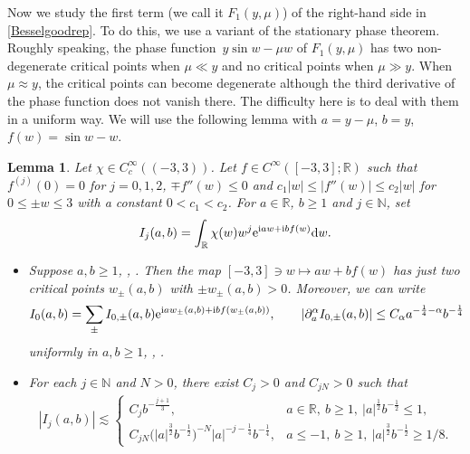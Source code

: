\documentclass[10pt,a4paper]{amsart}
\numberwithin{equation}{section}
\newtheorem{Lemma}[Theorem]{Lemma}
\def\R{\mathbb{R}}%
\def\a{\alpha}
\def\m{\mu}
\def\pa{\partial}
\begin{document}
Now we study the first term (we call it $F_1(y,\m)$) of the right-hand side in \eqref{Besselgoodrep}. To do this, we use a variant of the stationary phase theorem. Roughly speaking, the phase function~${y\sin w-\m w}$ of $F_1(y,\m)$ has two non-degenerate critical points when $\m\ll y$ and no critical points when $\m\gg y$. When $\m \approx y$, the critical points can become degenerate although the third derivative of the phase function does not vanish there.
The difficulty here is to deal with them in a uniform way. We will use the following lemma with $a=y-\m$, $b=y$, $f(w)=\sin w-w$.

\begin{Lemma}\label{appstphasevai}
Let $\chi\in C_c^{\infty}((-3,3))$. Let $f\in C^{\infty}([-3,3];\R)$ such that $f^{(j)}(0)=0$ for $j=0,1,2$, $\mp f''(w)\leq 0$ and $c_1|w|\leq |f''(w)|\leq c_2|w|$ for $0\leq \pm w\leq 3$ with a constant $0<c_1<c_2$. For $a\in \R$, $b\geq 1$ and $j\in\mathbb{N}$, set
\begin{align}\label{appI_jdef}
I_j(a,b)=\int_{\R}\chi(w)w^j{\rm e}^{{\rm i}aw+{\rm i}bf(w)}{\rm d}w.
\end{align}

\begin{itemize}\itemsep=0pt
\item[$(i)$] Suppose $a,b\geq 1$, , . Then the map $[-3,3]\ni w\mapsto aw+bf(w)$ has just two critical points $w_{\pm}(a,b)$ with $\pm w_{\pm}(a,b)>0$. Moreover, we can write
\begin{align*}
I_0(a,b)=\sum_{\pm}I_{0,\pm}(a,b){\rm e}^{{\rm i} a w_{\pm}(a,b)+{\rm i}bf(w_{\pm}(a,b))},\qquad |\pa_a^{\a}I_{0,\pm}(a,b)|\leq C_{\a}a^{-\frac{1}{4}-\a}b^{-\frac{1}{4}}
\end{align*}
uniformly in $a,b\geq 1$, , .

\item[$(ii)$] For each $j\in\mathbb{N}$ and $N>0$, there exist $C_j>0$ and $C_{jN}>0$ such that
\begin{align*}
|I_j(a,b)|\lesssim \begin{cases}
C_jb^{-\frac{j+1}{3}}, & a\in \R,\  b\geq 1,\  |a|^{\frac{1}{2}}b^{-\frac{1}{2}}\leq 1, \\
C_{jN}\bigl(|a|^{\frac{3}{2}}b^{-\frac{1}{2}}\bigr)^{-N}|a|^{-j-\frac{1}{4}}b^{-\frac{1}{4}},&  a\leq -1,\  b\geq 1,\
  |a|^{\frac{3}{2}}b^{-\frac{1}{2}}\geq 1/8.
\end{cases}
\end{align*}
\end{itemize}
\end{Lemma}
\end{document}

